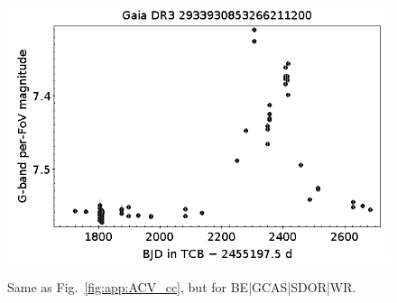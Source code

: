 \documentclass[longauth]{aa}
\begin{document}
\begin{appendix}
\begin{figure}
\hspace{2mm}
 \includegraphics[width=0.45\hsize]{figures/appendix/BE-37.png} \\
\vspace{4mm}
 \caption{Same as Fig.~\ref{fig:app:ACV_cc}, but for BE|GCAS|SDOR|WR.}
 \label{fig:app:BE_cc}
\end{figure}




\end{appendix}
\end{document}
